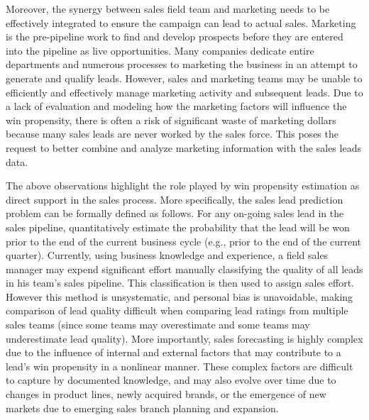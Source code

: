 \documentclass[10pt,conference]{IEEEtran}
\begin{document}
Moreover, the synergy between sales field team and marketing needs to be effectively integrated to ensure the campaign can lead to actual sales. Marketing is the pre-pipeline work to find and develop prospects before they are entered into the pipeline as live opportunities. Many companies dedicate entire departments and numerous processes to marketing the business\cite{coe2004fundamentals} in an attempt to generate and qualify leads. However, sales and marketing teams may be unable to efficiently and effectively manage marketing activity and subsequent leads. Due to a lack of evaluation and modeling how the marketing factors will influence the win propensity, there is often a risk of significant waste of marketing dollars because many sales leads are never worked by the sales force. This poses the request to better combine and analyze marketing information with the sales leads data.

The above observations highlight the role played by win propensity estimation as direct support in the sales process. More specifically, the sales lead prediction problem can be formally defined as follows. For any on-going sales lead in the sales pipeline, quantitatively estimate the probability that the lead will be won prior to the end of the current business cycle (e.g., prior to the end of the current quarter). Currently, using business knowledge and experience, a field sales manager may expend significant effort manually classifying the quality of all leads in his team's sales pipeline. This classification is then used to assign sales effort. However this method is unsystematic, and personal bias is unavoidable, making comparison of lead quality difficult when comparing lead ratings from multiple sales teams (since some teams may overestimate and some teams may underestimate lead quality). More importantly, sales forecasting is highly complex due to the influence of internal and external factors that may contribute to a lead's win propensity in a nonlinear manner\cite{kuo2001sales}. These complex factors are difficult to capture by documented knowledge, and may also evolve over time due to changes in product lines, newly acquired brands, or the emergence of new markets due to emerging sales branch planning and expansion.
\end{document}
